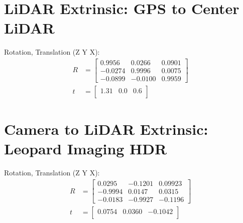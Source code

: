 \documentclass{erauthesis}
\begin{document}
\section{LiDAR Extrinsic: GPS to Center LiDAR}
Rotation, Translation (Z Y X):
\begin{subequations}
\begin{align}
R&=\left[\begin{array}{ccc}
0.9956 & 0.0266 & 0.0901 \\
-0.0274 & 0.9996 & 0.0075 \\
-0.0899 & -0.0100 & 0.9959
\end{array}\right]\\
t&=\left[\begin{array}{ccc}
1.31 & 0.0 & 0.6 \\
\end{array}\right]
\end{align}
\end{subequations}



\section{Camera to LiDAR Extrinsic: Leopard Imaging HDR}
Rotation, Translation (Z Y X):
\begin{subequations}
\begin{align}
R&=\left[\begin{array}{ccc}
0.0295 & -0.1201 & 0.09923 \\
-0.9994 & 0.0147 & 0.0315 \\
-0.0183 & -0.9927 & -0.1196
\end{array}\right]\\
t&=\left[\begin{array}{ccc}
0.0754 & 0.0360 & -0.1042 \\
\end{array}\right]
\end{align}
\end{subequations}
\end{document}

